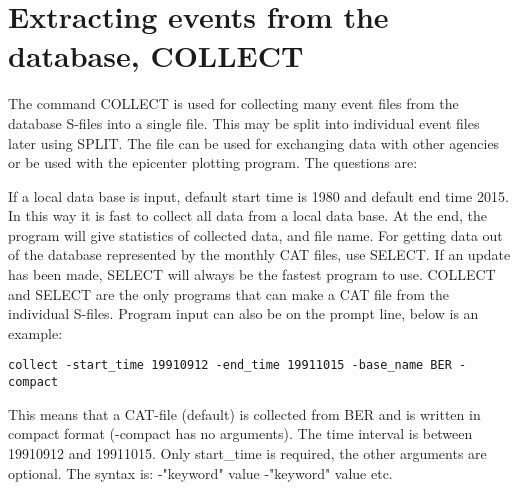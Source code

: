 
\section{Extracting events from the database, COLLECT}
\label{sect:collect}

The command COLLECT is used for collecting many event files from the database S-files into a single file. This may be split into individual event files later using SPLIT. The file can be used for exchanging data with other agencies or be used with the epicenter plotting program. The questions are: 



If a local data base is input, default start time is 1980 and default end time 2015. In this way it is fast to collect all data from a local data base. 
At the end, the program will give statistics of collected data, and file name. For getting data out of the database represented by the monthly CAT files, use SELECT. If an update has been made, SELECT will always be the fastest program to use. COLLECT and SELECT are the only programs that can make a CAT file from the individual S-files. Program input can also be on the prompt line, below is an example: 

\texttt{collect -start\_time 19910912 -end\_time 19911015 -base\_name BER -compact}

This means that a CAT-file (default) is collected from BER and is written in compact format (-compact has no arguments). The time interval is between 19910912 and 19911015. Only start\_time is required, the other arguments are optional. The syntax is:  -"keyword" value -"keyword" value etc. 

